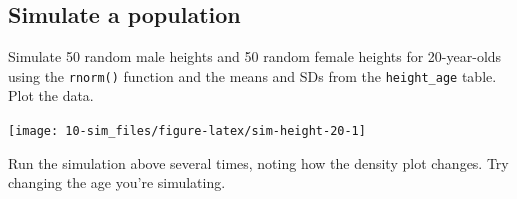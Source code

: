 \documentclass[
  oneside]{book}
\newenvironment{Shaded}{\begin{snugshade}}{\end{snugshade}}
\newcommand{\AttributeTok}[1]{\textcolor[rgb]{0.77,0.63,0.00}{#1}}
\newcommand{\DecValTok}[1]{\textcolor[rgb]{0.00,0.00,0.81}{#1}}
\newcommand{\FloatTok}[1]{\textcolor[rgb]{0.00,0.00,0.81}{#1}}
\newcommand{\FunctionTok}[1]{\textcolor[rgb]{0.00,0.00,0.00}{#1}}
\newcommand{\NormalTok}[1]{#1}
\newcommand{\OtherTok}[1]{\textcolor[rgb]{0.56,0.35,0.01}{#1}}
\newcommand{\SpecialCharTok}[1]{\textcolor[rgb]{0.00,0.00,0.00}{#1}}
\newcommand{\StringTok}[1]{\textcolor[rgb]{0.31,0.60,0.02}{#1}}
\begin{document}
\hypertarget{simulate-a-population}{%
\subsection{Simulate a population}\label{simulate-a-population}}

Simulate 50 random male heights and 50 random female heights for 20-year-olds using the \texttt{rnorm()} function and the means and SDs from the \texttt{height\_age} table. Plot the data.

\begin{Shaded}
\end{Shaded}

\begin{center}\texttt{[image: 10-sim\_files/figure-latex/sim-height-20-1]} \end{center}

\begin{try}
Run the simulation above several times, noting how the density plot changes. Try changing the age you're simulating.

\end{try}
\end{document}
